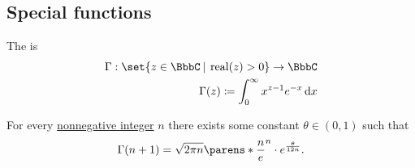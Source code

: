 \subsection{Special functions}\label{subsec:special_functions}

\begin{definition}\label{def:gamma_function}
  The  is
  \begin{equation*}
    \begin{aligned}
      \Gamma: \set{ z \in \BbbC \given \real(z) > 0 } \to \BbbC \\
      \Gamma(z) \coloneqq \int_0^\infty x^{z-1} e^{-x} \dl x
    \end{aligned}
  \end{equation*}
\end{definition}

\begin{theorem}\label{thm:stirlings_gamma_approximation}
  For every \hyperref[rem:peano_arithmetic_zero/nonnegative]{nonnegative integer} \( n \) there exists some constant \( \theta \in (0, 1) \) such that
  \begin{equation*}
    \Gamma(n + 1) = \sqrt{2 \pi n} \parens*{ \frac n e }^n \cdot e^{\frac \theta {12n}}.
  \end{equation*}
\end{theorem}
